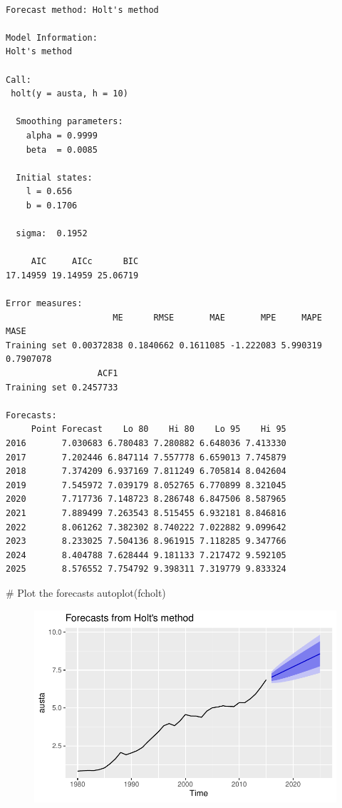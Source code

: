 \documentclass[
  letterpaper,
  DIV=11,
  numbers=noendperiod]{scrartcl}
\newenvironment{Shaded}{\begin{snugshade}}{\end{snugshade}}
\newcommand{\CommentTok}[1]{\textcolor[rgb]{0.37,0.37,0.37}{#1}}
\newcommand{\FunctionTok}[1]{\textcolor[rgb]{0.28,0.35,0.67}{#1}}
\newcommand{\NormalTok}[1]{\textcolor[rgb]{0.00,0.23,0.31}{#1}}
\begin{document}
\begin{verbatim}

Forecast method: Holt's method

Model Information:
Holt's method 

Call:
 holt(y = austa, h = 10) 

  Smoothing parameters:
    alpha = 0.9999 
    beta  = 0.0085 

  Initial states:
    l = 0.656 
    b = 0.1706 

  sigma:  0.1952

     AIC     AICc      BIC 
17.14959 19.14959 25.06719 

Error measures:
                     ME      RMSE       MAE       MPE     MAPE      MASE
Training set 0.00372838 0.1840662 0.1611085 -1.222083 5.990319 0.7907078
                  ACF1
Training set 0.2457733

Forecasts:
     Point Forecast    Lo 80    Hi 80    Lo 95    Hi 95
2016       7.030683 6.780483 7.280882 6.648036 7.413330
2017       7.202446 6.847114 7.557778 6.659013 7.745879
2018       7.374209 6.937169 7.811249 6.705814 8.042604
2019       7.545972 7.039179 8.052765 6.770899 8.321045
2020       7.717736 7.148723 8.286748 6.847506 8.587965
2021       7.889499 7.263543 8.515455 6.932181 8.846816
2022       8.061262 7.382302 8.740222 7.022882 9.099642
2023       8.233025 7.504136 8.961915 7.118285 9.347766
2024       8.404788 7.628444 9.181133 7.217472 9.592105
2025       8.576552 7.754792 9.398311 7.319779 9.833324
\end{verbatim}

\begin{Shaded}
\begin{Highlighting}[]
\CommentTok{\# Plot the forecasts}
\FunctionTok{autoplot}\NormalTok{(fcholt)}
\end{Highlighting}
\end{Shaded}

\begin{figure}[H]

{\centering \includegraphics{forecasting_datacamp_ex_files/figure-pdf/unnamed-chunk-14-1.pdf}

}

\end{figure}
\end{document}
